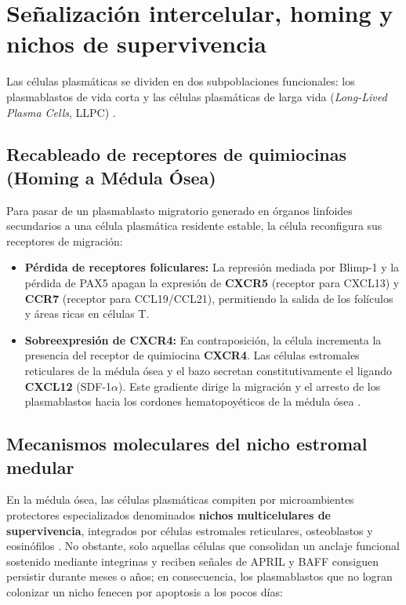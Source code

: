\section{Señalización intercelular, homing y nichos de supervivencia}

Las células plasmáticas se dividen en dos subpoblaciones funcionales: los plasmablastos de vida corta y las células plasmáticas de larga vida (\emph{Long-Lived Plasma Cells}, LLPC) \parencite{radbruch2006competence}.

\subsection{Recableado de receptores de quimiocinas (Homing a Médula Ósea)}
Para pasar de un plasmablasto migratorio generado en órganos linfoides secundarios a una célula plasmática residente estable, la célula reconfigura sus receptores de migración:
\begin{itemize}
	\item \textbf{Pérdida de receptores foliculares:} La represión mediada por Blimp-1 y la pérdida de PAX5 apagan la expresión de \textbf{CXCR5} (receptor para CXCL13) y \textbf{CCR7} (receptor para CCL19/CCL21), permitiendo la salida de los folículos y áreas ricas en células T.
	\item \textbf{Sobreexpresión de CXCR4:} En contraposición, la célula incrementa la presencia del receptor de quimiocina \textbf{CXCR4}. Las células estromales reticulares de la médula ósea y el bazo secretan constitutivamente el ligando \textbf{CXCL12} (SDF-1$\alpha$). Este gradiente dirige la migración y el arresto de los plasmablastos hacia los cordones hematopoyéticos de la médula ósea \parencite{radbruch2006competence,tellier2019plasma}.
\end{itemize}

\subsection{Mecanismos moleculares del nicho estromal medular}
En la médula ósea, las células plasmáticas compiten por microambientes protectores especializados denominados \textbf{nichos multicelulares de supervivencia}, integrados por células estromales reticulares, osteoblastos y eosinófilos \parencite{radbruch2006competence}. No obstante, solo aquellas células que consolidan un anclaje funcional sostenido mediante integrinas y reciben señales de APRIL y BAFF consiguen persistir durante meses o años; en consecuencia, los plasmablastos que no logran colonizar un nicho fenecen por apoptosis a los pocos días:


